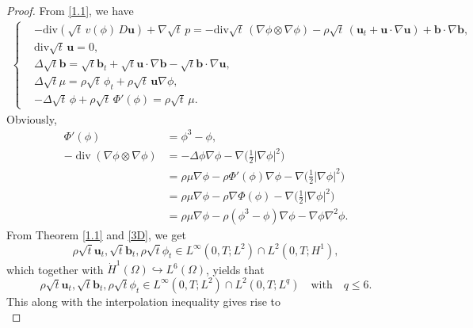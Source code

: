 \documentclass[11pt]{article}
\numberwithin{equation}{section}
\begin{document}
\begin{proof}
From \eqref{1.1}, we have
\begin{align}
\begin{cases}
&-\mathrm{div}\left( \sqrt{t}\, v(\phi)\, D\mathbf{u} \right) + \nabla \sqrt{t}\, p = -\mathrm{div}\sqrt{t}\, (\nabla \phi \otimes \nabla \phi) - \rho \sqrt{t}\, (\mathbf{u}_t + \mathbf{u} \cdot \nabla \mathbf{u})+  \mathbf{b} \cdot \nabla \mathbf{b}
,\label{eq-n} \\
&\mathrm{div}\sqrt{t}\, \mathbf{u} = 0,\\
&\Delta\sqrt{t}\mathbf{b}=\sqrt{t}\mathbf{b}_t + \sqrt{t}\mathbf{u} \cdot \nabla \mathbf{b}-\sqrt{t}\mathbf{b} \cdot \nabla \mathbf{u},\\
&\Delta \sqrt{t}\mu = \rho \sqrt{t}\, \phi_t + \rho \sqrt{t}\, \mathbf{u} \nabla \phi, \\
&-\Delta \sqrt{t}\, \phi + \rho \sqrt{t}\, \Phi'(\phi) = \rho \sqrt{t}\, \mu.
\end{cases}
\end{align}
Obviously,
\begin{equation*}
\begin{split}
\Phi'(\phi)&=\phi^3-\phi,\\
-\operatorname{div}(\nabla \phi \otimes \nabla \phi) &= -\Delta \phi \nabla \phi - \nabla \Big( \frac{1}{2} |\nabla \phi|^2 \Big) \\
&= \rho \mu \nabla \phi - \rho \Phi'(\phi) \nabla \phi - \nabla \Big( \frac{1}{2} |\nabla \phi|^2 \Big) \\
&= \rho \mu \nabla \phi - \rho \nabla \Phi(\phi) - \nabla \Big( \frac{1}{2} |\nabla \phi|^2 \Big)\\
&= \rho \mu \nabla \phi - \rho (\phi^3-\phi)\nabla\phi - \nabla\phi \nabla^2\phi.
\end{split}
\end{equation*}
From Theorem \ref{1.1} and \eqref{3D}, we get
\begin{equation*}
\rho\sqrt{t}\mathbf{u}_t, \sqrt{t}\mathbf{b}_t, \rho\sqrt{t}\phi_t \in L^\infty(0,T;L^2) \cap L^2(0,T;H^1),
\end{equation*}
which together with $\dot{H}^1(\Omega) \hookrightarrow L^6(\Omega)$, yields that
\begin{equation*}
\rho\sqrt{t}\mathbf{u}_t, \sqrt{t}\mathbf{b}_t, \rho\sqrt{t}\phi_t \in L^\infty(0,T;L^2) \cap L^2(0,T;L^q) \quad \text{with} \quad q \leq 6.
\end{equation*}
This along with the interpolation inequality  gives rise to
\begin{equation*}

\end{equation*}
\end{proof}
\end{document}
